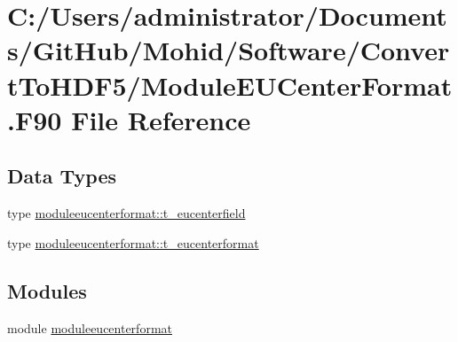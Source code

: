 \hypertarget{_module_e_u_center_format_8_f90}{}\section{C\+:/\+Users/administrator/\+Documents/\+Git\+Hub/\+Mohid/\+Software/\+Convert\+To\+H\+D\+F5/\+Module\+E\+U\+Center\+Format.F90 File Reference}
\label{_module_e_u_center_format_8_f90}
\subsection*{Data Types}
\begin{DoxyCompactItemize}
\item 
type \mbox{\hyperlink{structmoduleeucenterformat_1_1t__eucenterfield}{moduleeucenterformat\+::t\+\_\+eucenterfield}}
\item 
type \mbox{\hyperlink{structmoduleeucenterformat_1_1t__eucenterformat}{moduleeucenterformat\+::t\+\_\+eucenterformat}}
\end{DoxyCompactItemize}
\subsection*{Modules}
\begin{DoxyCompactItemize}
\item 
module \mbox{\hyperlink{namespacemoduleeucenterformat}{moduleeucenterformat}}
\end{DoxyCompactItemize}
